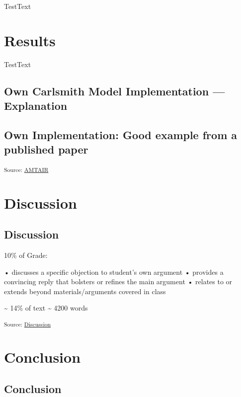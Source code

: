 \documentclass[12pt,a4paper]{report}      %
\begin{document}
TestText

\chapter{Results}\label{results}

TestText

\section{Own Carlsmith Model Implementation ---
Explanation}\label{own-carlsmith-model-implementation-explanation}

\section{Own Implementation: Good example from a published
paper}\label{own-implementation-good-example-from-a-published-paper}

\textsubscript{Source:
\href{https://VJMeyer.github.io/submission/chapters/AMTAIR.qmd.html\#0f4af2cf-5b69-4af3-9697-84c173b2e319}{AMTAIR}}

\chapter{Discussion}\label{discussion}

\section{Discussion}\label{discussion-1}

10\% of Grade:

• discusses a specific objection to student's own argument • provides a
convincing reply that bolsters or refines the main argument • relates to
or extends beyond materials/arguments covered in class

\textasciitilde{} 14\% of text \textasciitilde{} 4200 words

\textsubscript{Source:
\href{https://VJMeyer.github.io/submission/chapters/Discussion.qmd.html\#6a205f09-6bca-40a9-a723-98d31e3907f4}{Discussion}}

\chapter{Conclusion}\label{conclusion}

\section{Conclusion}\label{conclusion-1}
\end{document}
